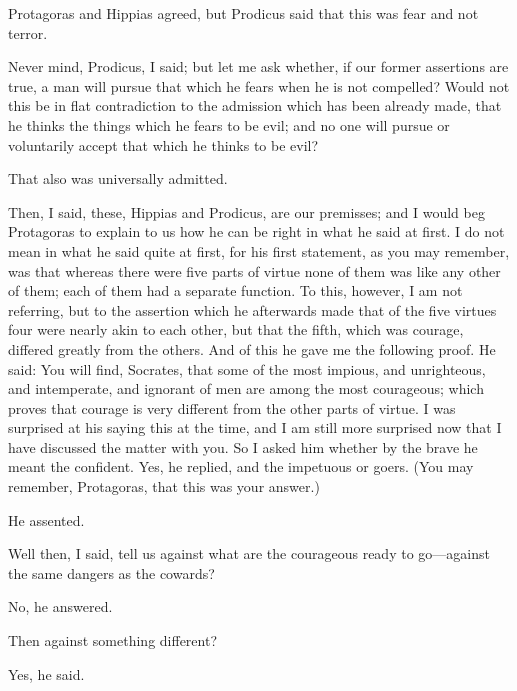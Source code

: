 \documentclass[11pt,letter]{article}
\begin{document}
\par  Protagoras and Hippias agreed, but Prodicus said that this was fear and not terror.

\par  Never mind, Prodicus, I said; but let me ask whether, if our former assertions are true, a man will pursue that which he fears when he is not compelled? Would not this be in flat contradiction to the admission which has been already made, that he thinks the things which he fears to be evil; and no one will pursue or voluntarily accept that which he thinks to be evil?

\par  That also was universally admitted.

\par  Then, I said, these, Hippias and Prodicus, are our premisses; and I would beg Protagoras to explain to us how he can be right in what he said at first. I do not mean in what he said quite at first, for his first statement, as you may remember, was that whereas there were five parts of virtue none of them was like any other of them; each of them had a separate function. To this, however, I am not referring, but to the assertion which he afterwards made that of the five virtues four were nearly akin to each other, but that the fifth, which was courage, differed greatly from the others. And of this he gave me the following proof. He said: You will find, Socrates, that some of the most impious, and unrighteous, and intemperate, and ignorant of men are among the most courageous; which proves that courage is very different from the other parts of virtue. I was surprised at his saying this at the time, and I am still more surprised now that I have discussed the matter with you. So I asked him whether by the brave he meant the confident. Yes, he replied, and the impetuous or goers. (You may remember, Protagoras, that this was your answer.)

\par  He assented.

\par  Well then, I said, tell us against what are the courageous ready to go—against the same dangers as the cowards?

\par  No, he answered.

\par  Then against something different?

\par  Yes, he said.
\end{document}
